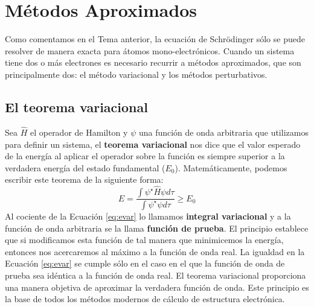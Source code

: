 \chapter{Métodos Aproximados}
Como comentamos en el Tema anterior, la ecuación de 
Schrödinger sólo se puede resolver de manera exacta 
para átomos mono-electrónicos. Cuando un sistema tiene 
dos o más electrones es necesario recurrir
a métodos aproximados, que son principalmente dos: el
método variacional y los métodos perturbativos. 

\section{El teorema variacional}
Sea $\hat{H}$ el operador de Hamilton y $\psi$ una función 
de onda arbitraria que utilizamos para definir un sistema, 
el \textbf{teorema variacional} nos dice que el valor 
esperado de la energía al aplicar el operador
sobre la función es siempre superior a la verdadera 
energía del estado fundamental ($E_0$). Matemáticamente, 
podemos escribir este teorema de la siguiente forma:
\begin{equation}
    E=\frac{\int{\psi^\star\hat{H}\psi d\tau}}{\int{\psi^\star \psi d\tau}} \geq E_0
    \label{eq:evar}
\end{equation}
Al cociente de la Ecuación \ref{eq:evar} lo llamamos
\textbf{integral variacional} y a la función de onda arbitraria
se la llama \textbf{función de prueba}. El principio establece
que si modificamos esta función de tal manera que minimicemos
la energía, entonces nos acercaremos al máximo a la función 
de onda real. La igualdad en la Ecuación \ref{eq:evar} se 
cumple sólo en el caso en el que la función de onda de prueba 
sea idéntica a la función de onda real. El teorema variacional
proporciona una manera objetiva de aproximar la verdadera función
de onda. Este principio es la base de todos los métodos modernos
de  cálculo de estructura electrónica.

